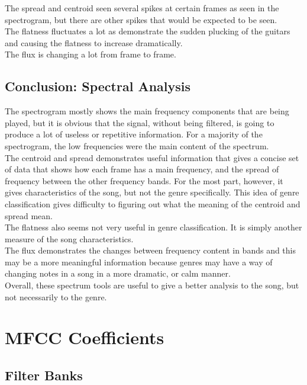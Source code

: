 \documentclass[11pt, a4paper]{article}
\begin{document}
The spread and centroid seen several spikes at certain frames as seen in the spectrogram, but there are other spikes that would be expected to be seen. \\

The flatness fluctuates a lot as demonstrate the sudden plucking of the guitars and causing the flatness to increase dramatically. \\

The flux is changing a lot from frame to frame. 

\subsection{Conclusion: Spectral Analysis}

The spectrogram mostly shows the main frequency components that are being played, but it is obvious that the signal, without being filtered, is going to produce a lot of useless or repetitive information. For a majority of the spectrogram, the low frequencies were the main content of the spectrum. \\

The centroid and spread demonstrates useful information that gives a concise set of data that shows how each frame has a main frequency, and the spread of frequency between the other frequency bands. For the most part, however, it gives characteristics of the song, but not the genre specifically. This idea of genre classification gives difficulty to figuring out what the meaning of the centroid and spread mean. \\

The flatness also seems not very useful in genre classification. It is simply another measure of the song characteristics. \\

The flux demonstrates the changes between frequency content in bands and this may be a more meaningful information because genres may have a way of changing notes in a song in a more dramatic, or calm manner. \\ 

Overall, these spectrum tools are useful to give a better analysis to the song, but not necessarily to the genre. 

\section{MFCC Coefficients}

\subsection{Filter Banks}
\end{document}
